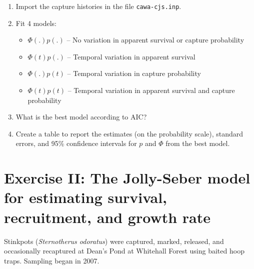 \documentclass[12pt]{article}\usepackage[]{graphicx}\usepackage[]{color}
\begin{document}
\begin{enumerate}
  \item Import the capture histories in the file
    \texttt{cawa-cjs.inp}.
  \item Fit 4 models:
    \begin{itemize}
      \item $\Phi(.)p(.)$ -- No variation in apparent survival or capture probability
      \item $\Phi(t)p(.)$ -- Temporal variation in apparent survival
      \item $\Phi(.)p(t)$ -- Temporal variation in capture probability
      \item $\Phi(t)p(t)$ -- Temporal variation in apparent survival and capture probability
    \end{itemize}
  \item What is the best model according to AIC?
  \item Create a table to report the estimates (on the probability
    scale), standard errors, and 95\% confidence intervals for $p$ and
    $\Phi$ from the best model. 
\end{enumerate}

  
\clearpage

\section*{\large  Exercise II: The Jolly-Seber model
  for estimating survival, recruitment, and growth rate}



Stinkpots ({\it Sternotherus odoratus}) were captured, marked,
released, and occasionally recaptured at Dean's Pond at Whitehall
Forest using baited hoop traps. Sampling began in 2007. 



\end{document}
